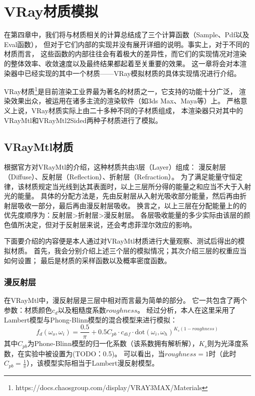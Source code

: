 \chapter{VRay材质模拟}
\label{cha:vray}

在第四章中，我们将与材质相关的计算总结成了三个计算函数（Sample、Pdf以及Eval函数），
但对于它们内部的实现并没有展开详细的说明。事实上，对于不同的材质而言，
这些函数的内部往往会有着极大的差异性，而它们的实现情况对渲染的整体效率、收敛速度以及最终结果都起着至关重要的效果。
这一章将会对本渲染器中已经实现的其中一个材质——VRay模拟材质的具体实现情况进行介绍。

VRay材质\footnote{https://docs.chaosgroup.com/display/VRAY3MAX/Materials}是目前渲染工业界最为著名的材质之一，它支持的功能十分广泛，
渲染效果出众，被运用在诸多主流的渲染软件（如3ds Max、Maya等）上。
严格意义上说，VRay材质实际上由二十多种不同的子材质组成，
本渲染器只对其中的VRayMtl和VRayMtl2Sided两种子材质进行了模拟。


\section{VRayMtl材质}

根据官方对VRayMtl的介绍，这种材质共由3层（Layer）组成：
漫反射层（Diffuse）、反射层（Reflection）、折射层（Refraction）。
为了满足能量守恒定律，该材质规定当光线到达其表面时，以上三层所分得的能量之和应当不大于入射光的能量。
具体的分配方法是，先由反射层从入射光吸收部分能量，然后再由折射层吸收一部分，最后再由漫反射层吸收。
换言之，以上三层在分配能量上的的优先度顺序为：反射层>折射层>漫反射层。
各层吸收能量的多少实际由该层的颜色值所决定，但对于反射层来说，还会考虑菲涅尔效应的影响。

下面要介绍的内容便是本人通过对VRayMtl材质进行大量观察、测试后得出的模拟材质。
首先，我会分别介绍上述三个层的模拟情况；其次介绍三层的权重应当如何设置；
最后是材质的采样函数以及概率密度函数。

\subsection{漫反射层}

在VRayMtl中，漫反射层是三层中相对而言最为简单的部分。
它一共包含了两个参数：材质颜色$c_{d}$以及粗糙度系数$roughness$。
经过分析，本人在这里采用了Lambert模型与Phong-Blinn模型的混合模型来进行模拟：
\begin{equation}
f_d(\omega_o, \omega_i) = \frac{0.5}{\pi} + 0.5C_{pb}\cdot c_{dif} \cdot \text{dot}(\omega_i, \omega_h)^{K_s(1-roughness)}
\end{equation}
其中$C_{pb}$为Phone-Blinn模型的归一化系数（该系数拥有解析解\cite{Phong}），$K_s$则为光泽度系数，在实验中被设置为(TODO：0.5)。
可以看出，当$roughness=1$时（此时$C_{pb}=\frac{1}{\pi}$），该模型实际相当于Lambert漫反射模型。


